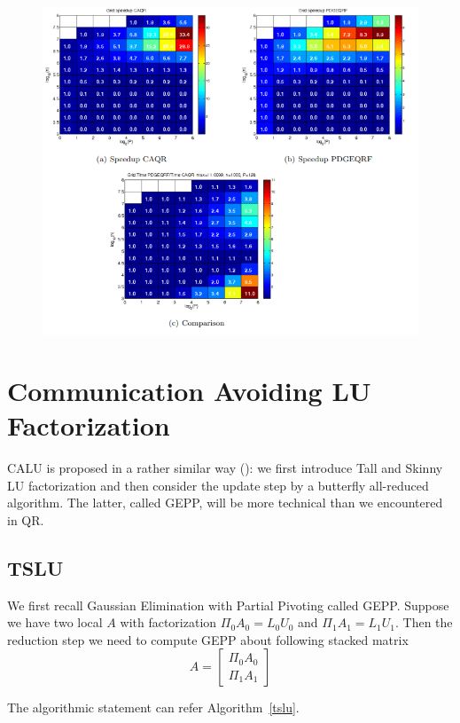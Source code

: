 \documentclass{article}
\begin{document}
\begin{figure}[htbp]
	\centering
	\includegraphics[scale=.7]{CAQR_res3.png}
\end{figure}
 \section{Communication Avoiding LU Factorization}
 CALU is proposed in a rather similar way (\cite{grigori_communication_2008, grigori_calu_2011}): we first introduce Tall and Skinny LU factorization and then consider the update step by a butterfly all-reduced algorithm. The latter, called GEPP, will be more technical than we encountered in QR.

\subsection{TSLU}
We first recall Gaussian Elimination with Partial Pivoting called GEPP. Suppose we have two local $A$ with factorization $\Pi_{0}A_0 = L_0 U_0$ and $\Pi_1A_1 = L_1 U_1$. Then the reduction step we need to compute GEPP about following stacked matrix 
$$A = \begin{bmatrix}
\Pi_0A_0 \\ \Pi_1 A_1
\end{bmatrix}
$$

The algorithmic statement can refer Algorithm~\ref{tslu}.
\end{document}
